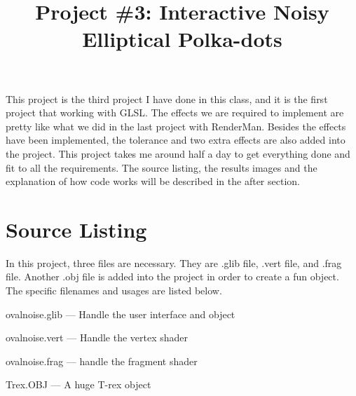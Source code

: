 \documentclass[letterpaper,14pt,titlepage,fleqn]{article}
\author{\name}
\title{Project \#3: Interactive Noisy Elliptical Polka-dots}
\begin{document}
\maketitle

This project is the third project I have done in this class, and it is the first project that working with GLSL. The effects we are required to implement are pretty like what we did in the last project with RenderMan. Besides the effects have been implemented, the tolerance and two extra effects are also added into the project. This project takes me around half a day to get everything done and fit to all the requirements. The source listing, the results images and the explanation of how code works will be described in the after section. 

\section{Source Listing}
In this project, three files are necessary. They are .glib file, .vert file, and .frag file. Another .obj file is added into the project in order to create a fun object. The specific filenames and usages are listed below.

ovalnoise.glib --- Handle the user interface and object

ovalnoise.vert --- Handle the vertex shader

ovalnoise.frag --- handle the fragment shader

Trex.OBJ --- A huge T-rex object
\end{document}
